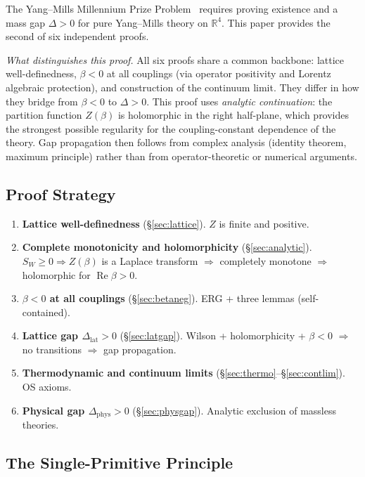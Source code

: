 \documentclass[12pt,a4paper]{article}
\theoremstyle{plain}
\theoremstyle{definition}
\theoremstyle{remark}
\begin{document}
The Yang--Mills Millennium Prize Problem~\cite{JaffeWitten2000} requires proving existence and a mass gap $\Delta>0$ for pure Yang--Mills theory on $\mathbb{R}^4$. This paper provides the second of six independent proofs.

\textit{What distinguishes this proof.} All six proofs share a common backbone: lattice well-definedness, $\beta<0$ at all couplings (via operator positivity and Lorentz algebraic protection), and construction of the continuum limit. They differ in how they bridge from $\beta<0$ to $\Delta>0$. This proof uses \emph{analytic continuation}: the partition function $Z(\beta)$ is holomorphic in the right half-plane, which provides the strongest possible regularity for the coupling-constant dependence of the theory. Gap propagation then follows from complex analysis (identity theorem, maximum principle) rather than from operator-theoretic or numerical arguments.

\subsection{Proof Strategy}\label{sec:strategy}

\begin{enumerate}[label=\textbf{S\arabic*},leftmargin=3em]
\item \textbf{Lattice well-definedness} (\S\ref{sec:lattice}). $Z$ is finite and positive.
\item \textbf{Complete monotonicity and holomorphicity} (\S\ref{sec:analytic}). $S_W\geq 0\Rightarrow Z(\beta)$ is a Laplace transform $\Rightarrow$ completely monotone $\Rightarrow$ holomorphic for $\operatorname{Re}\beta>0$.
\item \textbf{$\beta<0$ at all couplings} (\S\ref{sec:betaneg}). ERG + three lemmas (self-contained).
\item \textbf{Lattice gap $\Delta_{\mathrm{lat}}>0$} (\S\ref{sec:latgap}). Wilson + holomorphicity + $\beta<0$ $\Rightarrow$ no transitions $\Rightarrow$ gap propagation.
\item \textbf{Thermodynamic and continuum limits} (\S\ref{sec:thermo}--\S\ref{sec:contlim}). OS axioms.
\item \textbf{Physical gap $\Delta_{\mathrm{phys}}>0$} (\S\ref{sec:physgap}). Analytic exclusion of massless theories.
\end{enumerate}

\subsection{The Single-Primitive Principle}\label{sec:primitive}
\end{document}
